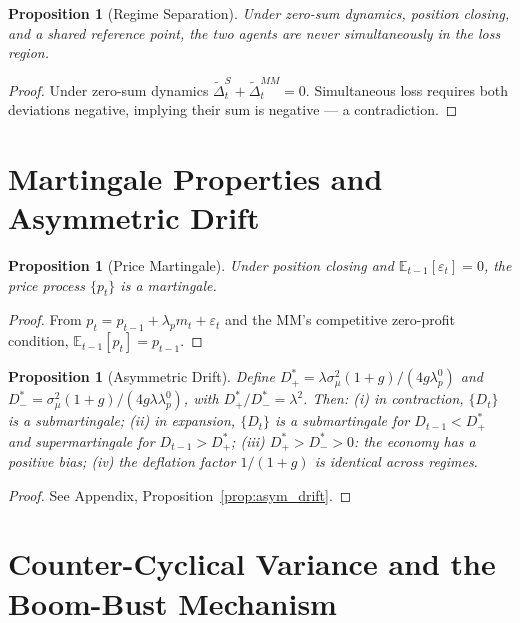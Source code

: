 \documentclass[12pt,a4paper]{article}
\newtheorem{proposition}[theorem]{Proposition}
\theoremstyle{definition}
\begin{document}
\begin{proposition}[Regime Separation]
\label{prop:regime_separation}
Under zero-sum dynamics, position closing, and a shared reference point,
the two agents are never simultaneously in the loss region.
\end{proposition}

\begin{proof}
Under zero-sum dynamics $\tilde{\Delta}^S_t + \tilde{\Delta}^{MM}_t = 0$.
Simultaneous loss requires both deviations negative, implying their sum
is negative --- a contradiction.
\end{proof}

\section{Martingale Properties and Asymmetric Drift}
\label{sec:martingale}

\begin{proposition}[Price Martingale]
Under position closing and $\mathbb{E}_{t-1}[\varepsilon_t] = 0$, the
price process $\{p_t\}$ is a martingale.
\end{proposition}

\begin{proof}
From $p_t = p_{t-1} + \lambda_p m_t + \varepsilon_t$ and the MM's
competitive zero-profit condition, $\mathbb{E}_{t-1}[p_t] = p_{t-1}$.
\end{proof}


\begin{proposition}[Asymmetric Drift]
\label{prop:asym_drift_main}
Define $D^*_+ = \lambda\sigma^2_\mu(1+g)/(4g\lambda^0_p)$ and
$D^*_- = \sigma^2_\mu(1+g)/(4g\lambda\lambda^0_p)$, with $D^*_+/D^*_- = \lambda^2$.
Then: (i) in contraction, $\{D_t\}$ is a submartingale; (ii) in expansion,
$\{D_t\}$ is a submartingale for $D_{t-1} < D^*_+$ and supermartingale for
$D_{t-1} > D^*_+$; (iii) $D^*_+ > D^*_- > 0$: the economy has a positive
bias; (iv) the deflation factor $1/(1+g)$ is identical across regimes.
\end{proposition}

\begin{proof}
See Appendix, Proposition~\ref{prop:asym_drift}.
\end{proof}

\section{Counter-Cyclical Variance and the Boom-Bust Mechanism}
\label{sec:countercyclical}
\end{document}
